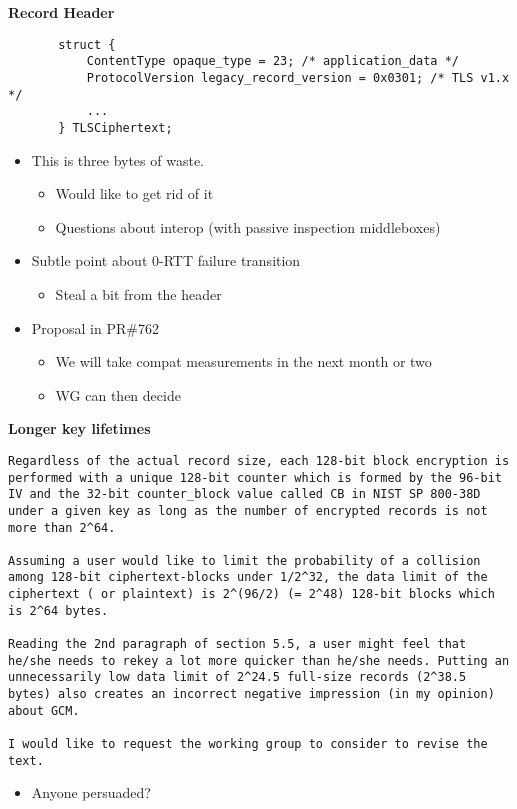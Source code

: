 \documentclass[helvetica]{seminar}
\newcommand{\heading}[1]{%
  \begin{center} 
    \large\bf 
    #1 
  \end{center} 
  \vspace{.4 in}}
\begin{document}
\begin{slide}
\heading{Record Header}

{\scriptsize
\begin{verbatim}
       struct {
           ContentType opaque_type = 23; /* application_data */
           ProtocolVersion legacy_record_version = 0x0301; /* TLS v1.x */
           ...
       } TLSCiphertext;
\end{verbatim}

\begin{itemize}
\item This is three bytes of waste.
  \begin{itemize}
  \item Would like to get rid of it
  \item Questions about interop (with passive inspection middleboxes)
  \end{itemize}
\item Subtle point about 0-RTT failure transition
  \begin{itemize}
  \item Steal a bit from the header
  \end{itemize}
\item Proposal in PR\#762
  \begin{itemize}
  \item We will take compat measurements in the next month or two
  \item WG can then decide
  \end{itemize}
\end{itemize}
}
\end{slide}

\begin{slide}
\heading{Longer key lifetimes}

\vspace{-2ex}
{\scriptsize
\begin{verbatim}
Regardless of the actual record size, each 128-bit block encryption is
performed with a unique 128-bit counter which is formed by the 96-bit
IV and the 32-bit counter_block value called CB in NIST SP 800-38D
under a given key as long as the number of encrypted records is not
more than 2^64.

Assuming a user would like to limit the probability of a collision
among 128-bit ciphertext-blocks under 1/2^32, the data limit of the
ciphertext ( or plaintext) is 2^(96/2) (= 2^48) 128-bit blocks which
is 2^64 bytes.

Reading the 2nd paragraph of section 5.5, a user might feel that
he/she needs to rekey a lot more quicker than he/she needs. Putting an
unnecessarily low data limit of 2^24.5 full-size records (2^38.5
bytes) also creates an incorrect negative impression (in my opinion)
about GCM.

I would like to request the working group to consider to revise the
text.
\end{verbatim}

\begin{itemize}
\item Anyone persuaded?
\end{itemize}
}

\end{slide}
\end{document}
